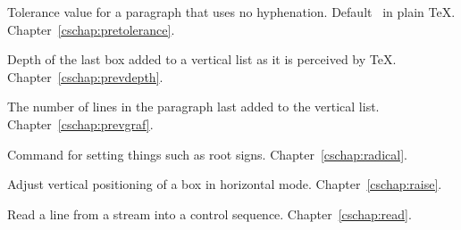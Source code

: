 \begin{glossinventory}
\item [\cs{pretolerance}]
      Tolerance value for a paragraph that uses no hyphenation. 
      Default~ in plain \TeX.
Chapter~\ref{cschap:pretolerance}.

\item [\cs{prevdepth}] 
      Depth of the last box added to a vertical list as it is 
      perceived by \TeX.
Chapter~\ref{cschap:prevdepth}.

\item [\cs{prevgraf}] 
      The number of lines in the paragraph last
      added to the vertical list.
Chapter~\ref{cschap:prevgraf}.

\item [\cs{radical\gr{24-bit number}}]
      Command for setting things such as root signs.
Chapter~\ref{cschap:radical}.

\item [\cs{raise\gr{dimen}\gr{box}}]
      Adjust vertical positioning of a box in horizontal mode. 
Chapter~\ref{cschap:raise}.

\item [\cs{read\gr{number}\n{to}\gr{control sequence}}]
      Read a line from a stream into a control sequence.
Chapter~\ref{cschap:read}.


\end{glossinventory}
